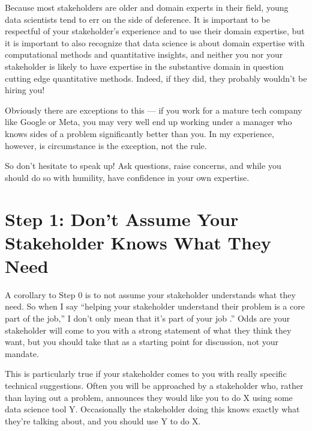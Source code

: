 \documentclass[letterpaper,10pt,english]{jupyterBook}
\begin{document}
\sphinxAtStartPar
Because most stakeholders are older and domain experts in their field, young data scientists tend to err on the side of deference. It is important to be respectful of your stakeholder’s experience and to use their domain expertise, but it is important to also recognize that data science is about  domain expertise with computational methods and quantitative insights, and neither you nor your stakeholder is likely to have expertise in  the substantive domain in question  cutting edge quantitative methods. Indeed, if they did, they probably wouldn’t be hiring you!%
\begin{footnote}[1]\sphinxAtStartFootnote
Obviously there are exceptions to this — if you work for a mature tech company like Google or Meta, you may very well end up working under a manager who knows sides of a problem significantly better than you. In my experience, however, is circumstance is the exception, not the rule.
%
\end{footnote} So don’t hesitate to speak up! Ask questions, raise concerns, and while you should do so with  humility, have confidence in your own expertise.


\section{Step 1: Don’t Assume Your Stakeholder Knows What They Need}
\label{\detokenize{20_problems_to_questions/20_stakeholder_management:step-1-don-t-assume-your-stakeholder-knows-what-they-need}}
\sphinxAtStartPar
A corollary to Step 0 is to not assume your stakeholder understands what they need. So when I say “helping your stakeholder understand their problem is a core part of the job,” I don’t only mean that it’s part of your job .” Odds are your stakeholder will come to you with a strong statement of what they think they want, but you should take that as a starting point for discussion, not your mandate.

\sphinxAtStartPar
This is particularly true if your stakeholder comes to you with really specific technical suggestions. Often you will be approached by a stakeholder who, rather than laying out a problem, announces they would like you to do X using some data science tool Y. Occasionally the stakeholder doing this knows exactly what they’re talking about, and you should use Y to do X.
\end{document}
